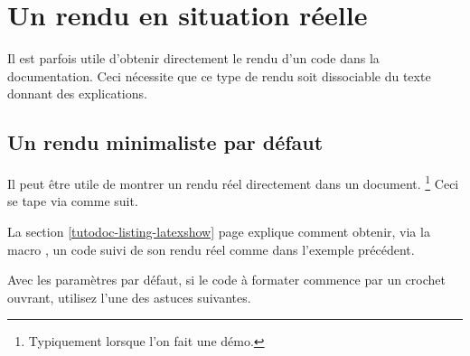\documentclass{tutodoc}
\begin{document}
\section{Un rendu en situation réelle}
\label{tutodoc-showcase}

Il est parfois utile d'obtenir directement le rendu d'un code dans la documentation. Ceci nécessite que ce type de rendu soit dissociable du texte donnant des explications.



\subsection{Un rendu minimaliste par défaut}

\begin{tdocexa}
    Il peut être utile de montrer un rendu réel directement dans un document.%
    \footnote{
        Typiquement lorsque l'on fait une démo.
    }
    Ceci se tape via  comme suit.

\end{tdocexa}


\begin{tdocrem}
    La section \ref{tutodoc-listing-latexshow} page \pageref{tutodoc-listing-latexshow} explique comment obtenir, via la macro , un code suivi de son rendu réel comme dans l'exemple précédent.
\end{tdocrem}


\begin{tdocwarn}
    Avec les paramètres par défaut, si le code à formater commence par un crochet ouvrant, utilisez l'une des astuces suivantes.

\end{tdocwarn}
\end{document}

